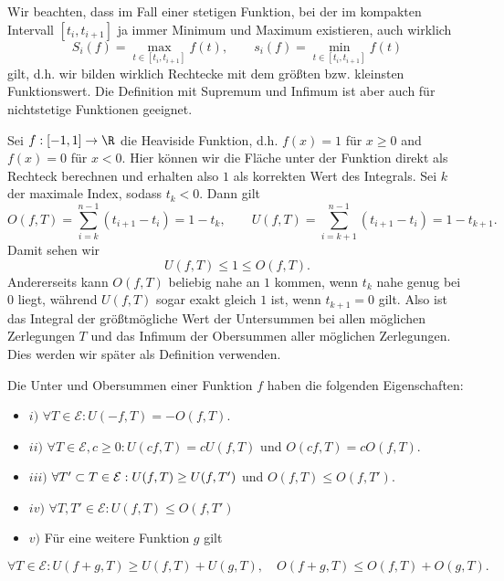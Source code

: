\documentclass[letterpaper,10pt,english]{jupyterBook}
\begin{document}
Wir beachten, dass im Fall einer stetigen Funktion, bei der im kompakten Intervall \([t_i,t_{i+1}]\) ja immer Minimum und Maximum existieren, auch wirklich
\begin{equation*}
 S_i(f) =  \max_{t \in  [t_i,t_{i+1}]} f(t), \qquad s_i(f) =  \min_{t \in  [t_i,t_{i+1}]} f(t)
\end{equation*}
gilt, d.h. wir bilden wirklich Rechtecke mit dem größten bzw. kleinsten Funktionswert. Die Definition mit Supremum und Infimum ist aber auch für nichtstetige Funktionen geeignet.
\label{integration/integration:example-0}
\begin{example}{}{}



Sei \(f:[-1,1] \rightarrow \R\) die Heaviside Funktion, d.h. \(f(x) =1 \) für \(x \geq 0\) and \(f(x) = 0\) für \(x < 0\). Hier können wir die Fläche unter der Funktion direkt als Rechteck berechnen und erhalten also \(1\) als korrekten Wert des Integrals.
Sei \(k\) der maximale Index, sodass \(t_k < 0\). Dann gilt
\begin{equation*}
  O(f,T) = \sum_{i=k}^{n-1} (t_{i+1} - t_i) = 1 - t_k, \qquad U(f,T) = \sum_{i=k+1}^{n-1} (t_{i+1} - t_i) = 1 - t_{k+1}.\end{equation*}
Damit sehen wir
\begin{equation*}
 U(f,T) \leq 1 \leq O(f,T).
\end{equation*}
Andererseits kann \(O(f,T)\) beliebig nahe an \(1\) kommen, wenn \(t_k\) nahe genug bei \(0\) liegt, während \(U(f,T)\) sogar exakt gleich \(1\) ist, wenn \(t_{k+1} = 0\) gilt. Also ist das Integral der größtmögliche Wert der Untersummen bei allen möglichen Zerlegungen \(T\) und das Infimum der Obersummen aller möglichen Zerlegungen. Dies werden wir später als Definition verwenden.
\end{example}
\label{integration/integration:lemma-1}
\begin{lemma}{}{}



Die Unter  und Obersummen einer Funktion \(f\) haben die folgenden Eigenschaften:
\begin{itemize}
\item {} 
\(i)\) \(\forall T \in {\mathcal E}: U(-f,T) = - O(f,T)\).

\item {} 
\(ii)\) \(\forall T \in {\mathcal E}, c \geq 0: U(cf,T) = c U(f,T)\) und \(O(cf,T) = c O(f,T).\)

\item {} 
\(iii)\) \(\forall T' \subset T \in {\cal E}: U(f,T) \geq U(f,T')\) und \(O(f,T) \leq O(f,T')\).

\item {} 
\(iv)\) \(\forall T, T' \in {\mathcal E}: U(f,T) \leq O(f,T')\)

\item {} 
\(v)\) Für eine weitere Funktion \(g\) gilt

\end{itemize}
\begin{equation*}
\forall T \in {\mathcal E}: U(f+g,T) \geq U(f,T) + U(g,T), \quad O(f+g,T) \leq O(f,T) + O(g,T).
\end{equation*}\end{lemma}
\end{document}
